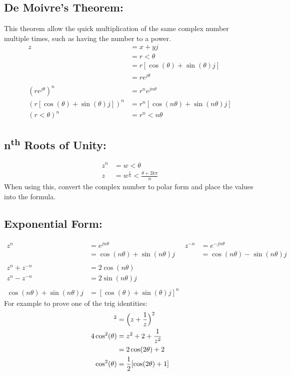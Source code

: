 \documentclass[a5paper]{article}
\begin{document}
	\subsection{De Moivre's Theorem:}
	This theorem allow the quick multiplication of the same complex number multiple times, such as having the number to a power.
	\begin{align*}
		z&=x+yj\\
		 &=r<\theta\\
		 &=r[\cos(\theta)+\sin(\theta)j]\\
		 &=re^{j\theta}\\\\
		(re^{j\theta})^{n}&=r^{n}e^{jn\theta}\\
		(r[\cos(\theta)+\sin(\theta)j])^{n}&=r^{n}[\cos(n\theta)+\sin(n\theta)j]\\
		(r<\theta)^{n}&=r^{n}<n\theta
	\end{align*}
	\subsection{\texorpdfstring{n\textsuperscript{th} Roots of Unity:}{n-th Roots of Unity:}}
	\begin{align*}
		z^{n}&=w<\theta\\
		z&=w^{\frac{1}{n}}<\frac{\theta+2k\pi}{n}
	\end{align*}
	When using this, convert the complex number to polar form and place the values into the formula.

	\subsection{Exponential Form:}
	\begin{align*}
		z^{n}&=e^{jn\theta} & z^{-n}&=e^{-jn\theta}\\
		     &=\cos(n\theta)+\sin(n\theta)j & &=\cos(n\theta)-\sin(n\theta)j\\\\
		z^{n}+z^{-n}&=2\cos(n\theta) & &\\
		z^{n}-z^{-n}&=2\sin(n\theta)j & &\\\\
		\cos(n\theta)+\sin(n\theta)j&=[\cos(\theta)+\sin(\theta)j]^{n} & &
	\end{align*}
	\break\break
	For example to prove one of the trig identities:
	\begin{align*}
		[2\cos(\theta)]^{2}&=\Bigl(z+\frac{1}{z}\Bigr)^{2}\\
		4\cos^{2}(\theta)&=z^{2}+2+\frac{1}{z^{2}}\\
				 &=2\cos(2\theta)+2\\
		\cos^{2}(\theta)&=\frac{1}{2}[\cos(2\theta)+1]
	\end{align*}
	
\end{document}
